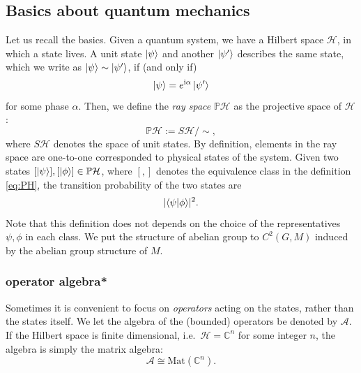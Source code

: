 \documentclass[
]{scrartcl}
\numberwithin{equation}{section}
\theoremstyle{definition}
\theoremstyle{definition}
\theoremstyle{definition}
\theoremstyle{definition}
\theoremstyle{remark}
\begin{document}
\hypertarget{basics-about-quantum-mechanics}{%
\subsection{Basics about quantum mechanics}\label{basics-about-quantum-mechanics}}

Let us recall the basics.
Given a quantum system, we have a Hilbert space \(\mathcal{H}\),
in which a state lives.
A unit state \(\ket{\psi}\) and another \(\ket{\psi'}\) describes the same state, which we write as \(\ket{\psi}\sim\ket{\psi'}\), if (and only if)
\begin{equation}
  \label{eq:phase-equiv}
  \ket{\psi} = e^{\mathrm{i}\alpha}\ket{\psi'}
\end{equation}
for some phase \(\alpha\).
Then, we define the \emph{ray space} \(\mathbb{P}\mathcal{H}\) as the projective space of \(\mathcal{H}\):
\begin{equation}
  \label{eq:PH}
  \mathbb{P}\mathcal{H} := S\mathcal{H}/\sim,
\end{equation}
where \(S\mathcal{H}\) denotes the space of unit states.
By definition, elements in the ray space are one-to-one corresponded to physical states of the system.
Given two states \([\ket{\psi}],[\ket{\phi}] \in \mathbb{P}\mathcal{H}\), where \([,]\) denotes the equivalence class in the definition \eqref{eq:PH}, the transition probability of the two states are
\begin{equation}
  \label{eq:transprob}
  \lvert \braket{\psi|\phi}\rvert^2.
\end{equation}
Note that this definition does not depends on the choice of the representatives \(\psi,\phi\) in each class.
We put the structure of abelian group to \(C^2(G,M)\) induced by the abelian group structure of \(M\).

\hypertarget{operator-algebra}{%
\subsubsection{operator algebra*}\label{operator-algebra}}

Sometimes it is convenient to focus on \emph{operators} acting on the states, rather than the states itself.
We let the algebra of the (bounded) operators be denoted by \(\mathcal{A}\).
If the Hilbert space is finite dimensional, i.e.~\(\mathcal{H} = \mathbb{C}^n\) for some integer \(n\),
the algebra is simply the matrix algebra:
\begin{equation}
  \label{eq:Amatrix}
  \mathcal{A} \cong \mathrm{Mat}(\mathbb{C}^n).
\end{equation}
\end{document}
